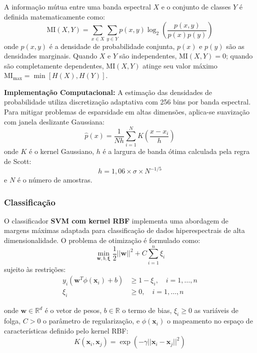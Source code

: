 A informação mútua entre uma banda espectral $X$ e o conjunto de classes $Y$ 
é definida matematicamente como:
\begin{equation}
\text{MI}(X,Y) = \sum_{x \in X} \sum_{y \in Y} p(x,y) \log_2 \left(\frac{p(x,y)}{p(x)p(y)}\right)
\label{eq:mutual_information}
\end{equation}
onde $p(x,y)$ é a densidade de probabilidade conjunta, $p(x)$ e $p(y)$ são 
as densidades marginais. Quando $X$ e $Y$ são independentes, $\text{MI}(X,Y) = 0$; 
quando são completamente dependentes, $\text{MI}(X,Y)$ atinge seu valor máximo 
$\text{MI}_{\max} = \min[H(X), H(Y)]$.

\textbf{Implementação Computacional:} A estimação das densidades de probabilidade 
utiliza discretização adaptativa com 256 bins por banda espectral. Para 
mitigar problemas de esparsidade em altas dimensões, aplica-se suavização 
com janela deslizante Gaussiana:
\begin{equation}
\hat{p}(x) = \frac{1}{N h} \sum_{i=1}^{N} K\left(\frac{x - x_i}{h}\right)
\label{eq:kernel_density}
\end{equation}
onde $K$ é o kernel Gaussiano, $h$ é a largura de banda ótima calculada 
pela regra de Scott:
\begin{equation}
h = 1{,}06 \times \sigma \times N^{-1/5}
\label{eq:scott_rule}
\end{equation}
e $N$ é o número de amostras.

\subsubsection{Classificação}

O classificador \textbf{SVM com kernel RBF} implementa uma abordagem de 
margens máximas adaptada para classificação de dados hiperespectrais de alta 
dimensionalidade. O problema de otimização é formulado como:
\begin{equation}
\min_{\mathbf{w},b,\boldsymbol{\xi}} \frac{1}{2}||\mathbf{w}||^2 + C \sum_{i=1}^{n} \xi_i
\label{eq:svm_primal}
\end{equation}
sujeito às restrições:
\begin{align}
y_i(\mathbf{w}^T \phi(\mathbf{x}_i) + b) &\geq 1 - \xi_i, \quad i = 1,\ldots,n \label{eq:svm_constraint1} \\
\xi_i &\geq 0, \quad i = 1,\ldots,n \label{eq:svm_constraint2}
\end{align}

onde $\mathbf{w} \in \mathbb{R}^d$ é o vetor de pesos, $b \in \mathbb{R}$ o termo de bias, 
$\xi_i \geq 0$ as variáveis de folga, $C > 0$ o parâmetro de regularização, 
e $\phi(\mathbf{x}_i)$ o mapeamento no espaço de características definido pelo kernel RBF:
\begin{equation}
K(\mathbf{x}_i, \mathbf{x}_j) = \exp\left(-\gamma ||\mathbf{x}_i - \mathbf{x}_j||^2\right)
\label{eq:rbf_kernel}
\end{equation}

